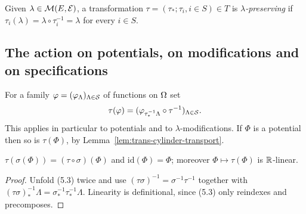 \begin{definition}
    \label{def:trans-lambda-preserving}

    Given $\lambda \in \mathcal{M}(E, \mathcal{E})$, a transformation
    $\tau = (\tau_*; \tau_i, i \in S) \in T$ is \emph{$\lambda$-preserving} if
    $\tau_i(\lambda) = \lambda \circ \tau_i^{-1} = \lambda$ for every $i \in S$.
\end{definition}

\subsection*{The action on potentials, on modifications and on specifications}

\begin{definition}
    \label{def:trans-potential-map}
    \leanok

    For a family $\varphi = (\varphi_\Lambda)_{\Lambda \in \mathcal{S}}$ of functions on $\Omega$ set
    \[\tau(\varphi) = (\varphi_{\tau_*^{-1}\Lambda} \circ \tau^{-1})_{\Lambda \in \mathcal{S}}.\]
    This applies in particular to potentials and to $\lambda$-modifications.  If $\Phi$ is a
    potential then so is $\tau(\Phi)$, by Lemma~\ref{lem:trans-cylinder-transport}.
\end{definition}

\begin{lemma}
    \label{lem:trans-potential-map-action}
    \leanok

    $\tau(\sigma(\Phi)) = (\tau \circ \sigma)(\Phi)$ and $\mathrm{id}(\Phi) = \Phi$; moreover
    $\Phi \mapsto \tau(\Phi)$ is $\mathbb{R}$-linear.
\end{lemma}
\begin{proof}
    \leanok

    Unfold (5.3) twice and use $(\tau\sigma)^{-1} = \sigma^{-1}\tau^{-1}$ together with
    $(\tau\sigma)_*^{-1}\Lambda = \sigma_*^{-1}\tau_*^{-1}\Lambda$.  Linearity is definitional,
    since (5.3) only reindexes and precomposes.
\end{proof}

